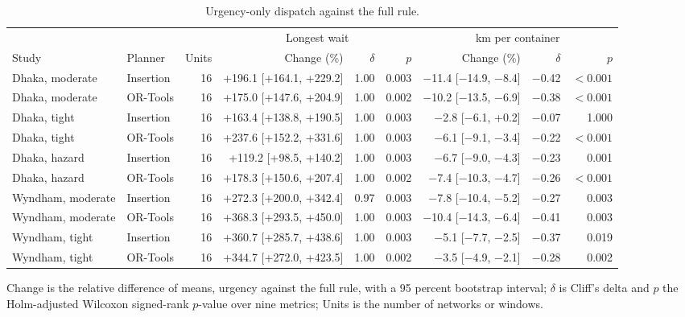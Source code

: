 \begin{table}[!htbp]
\caption{Urgency-only dispatch against the full rule.}
\label{tab:effects}
\centering
\footnotesize
\setlength{\tabcolsep}{2.5pt}
\begin{tabular}{llrrrrrrr}
\toprule
& & & \multicolumn{3}{c}{Longest wait} & \multicolumn{3}{c}{km per container} \\
\cmidrule(lr){4-6}\cmidrule(lr){7-9}
Study & Planner & Units & Change (\%) & $\delta$ & $p$ & Change (\%) & $\delta$ & $p$ \\
\midrule
Dhaka, moderate & Insertion & 16 & +196.1 [+164.1, +229.2] & 1.00 & 0.003 & \ensuremath{-}11.4 [\ensuremath{-}14.9, \ensuremath{-}8.4] & \ensuremath{-}0.42 & $<0.001$ \\
Dhaka, moderate & OR-Tools & 16 & +175.0 [+147.6, +204.9] & 1.00 & 0.002 & \ensuremath{-}10.2 [\ensuremath{-}13.5, \ensuremath{-}6.9] & \ensuremath{-}0.38 & $<0.001$ \\
Dhaka, tight & Insertion & 16 & +163.4 [+138.8, +190.5] & 1.00 & 0.003 & \ensuremath{-}2.8 [\ensuremath{-}6.1, +0.2] & \ensuremath{-}0.07 & 1.000 \\
Dhaka, tight & OR-Tools & 16 & +237.6 [+152.2, +331.6] & 1.00 & 0.003 & \ensuremath{-}6.1 [\ensuremath{-}9.1, \ensuremath{-}3.4] & \ensuremath{-}0.22 & $<0.001$ \\
Dhaka, hazard & Insertion & 16 & +119.2 [+98.5, +140.2] & 1.00 & 0.003 & \ensuremath{-}6.7 [\ensuremath{-}9.0, \ensuremath{-}4.3] & \ensuremath{-}0.23 & 0.001 \\
Dhaka, hazard & OR-Tools & 16 & +178.3 [+150.6, +207.4] & 1.00 & 0.002 & \ensuremath{-}7.4 [\ensuremath{-}10.3, \ensuremath{-}4.7] & \ensuremath{-}0.26 & $<0.001$ \\
Wyndham, moderate & Insertion & 16 & +272.3 [+200.0, +342.4] & 0.97 & 0.003 & \ensuremath{-}7.8 [\ensuremath{-}10.4, \ensuremath{-}5.2] & \ensuremath{-}0.27 & 0.003 \\
Wyndham, moderate & OR-Tools & 16 & +368.3 [+293.5, +450.0] & 1.00 & 0.003 & \ensuremath{-}10.4 [\ensuremath{-}14.3, \ensuremath{-}6.4] & \ensuremath{-}0.41 & 0.003 \\
Wyndham, tight & Insertion & 16 & +360.7 [+285.7, +438.6] & 1.00 & 0.003 & \ensuremath{-}5.1 [\ensuremath{-}7.7, \ensuremath{-}2.5] & \ensuremath{-}0.37 & 0.019 \\
Wyndham, tight & OR-Tools & 16 & +344.7 [+272.0, +423.5] & 1.00 & 0.002 & \ensuremath{-}3.5 [\ensuremath{-}4.9, \ensuremath{-}2.1] & \ensuremath{-}0.28 & 0.002 \\
\bottomrule
\end{tabular}
\par\smallskip\footnotesize Change is the relative difference of means, urgency against the full rule, with a 95 percent bootstrap interval; $\delta$ is Cliff's delta and $p$ the Holm-adjusted Wilcoxon signed-rank $p$-value over nine metrics; Units is the number of networks or windows.
\end{table}
